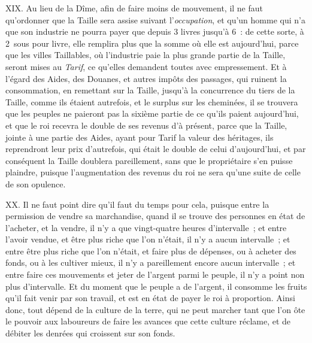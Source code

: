 \documentclass[french,twoside]{book} %
\begin{document}
XIX. Au lieu de la Dîme, afin de faire moins de mouvement, il ne faut qu’ordonner que la Taille sera assise suivant l’{\itshape occupation}, et qu’un homme qui n’a que son industrie ne pourra payer que depuis 3 livres jusqu’à 6 : de cette sorte, à 2 sous pour livre, elle remplira plus que la somme où elle est aujourd’hui, parce que les villes Taillables, où l’industrie paie la plus grande partie de la Taille, seront mises au {\itshape Tarif}, ce qu’elles demandent toutes avec empressement. Et à l’égard des Aides, des Douanes, et autres impôts des passages, qui ruinent la consommation, en remettant sur la Taille, jusqu’à la concurrence du tiers de la Taille, comme ils étaient autrefois, et le surplus sur les cheminées, il se trouvera que les peuples ne paieront pas la sixième partie de ce qu’ils paient aujourd’hui, et que le roi recevra le double de ses revenus d’à présent, parce que la Taille, jointe à une partie des Aides, ayant pour Tarif la valeur des héritages, ils reprendront leur prix d’autrefois, qui était le double de celui d’aujourd’hui, et par conséquent la Taille doublera pareillement, sans que le propriétaire s’en puisse plaindre, puisque l’augmentation des revenus du roi ne sera qu’une suite de celle de son opulence.\par
XX. Il ne faut point dire qu’il faut du temps pour cela, puisque entre la permission de vendre sa marchandise, quand il se trouve des personnes en état de l’acheter, et la vendre, il n’y a que vingt-quatre heures d’intervalle ; et entre l’avoir vendue, et être plus riche que l’on n’était, il n’y a aucun intervalle ; et entre être plus riche que l’on n’était, et faire plus de dépenses, ou à acheter des fonds, ou à les cultiver mieux, il n’y a pareillement encore aucun intervalle ; et entre faire ces mouvements et jeter de l’argent parmi le peuple, il n’y a point non plus d’intervalle. Et du moment que le peuple a de l’argent, il consomme les fruits qu’il fait venir par son travail, et est en état de payer le roi à proportion. Ainsi donc, tout dépend de la culture de la terre, qui ne peut marcher tant que l’on ôte le pouvoir aux laboureurs de faire les avances que cette culture réclame, et de débiter les denrées qui croissent sur son fonds.\par
\end{document}
